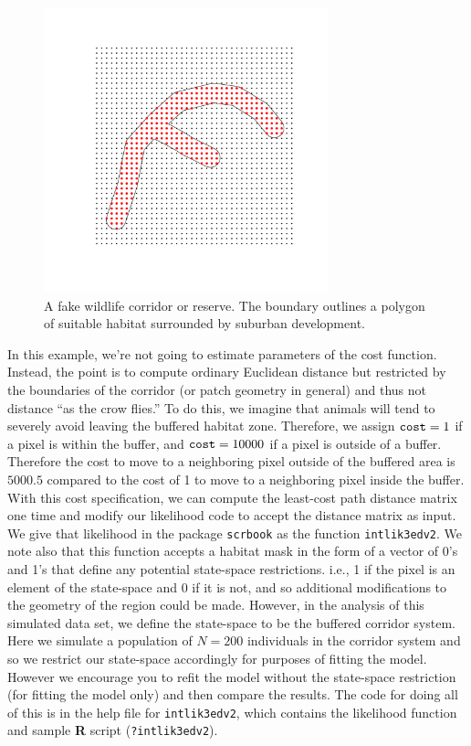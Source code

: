 \begin{figure}[h]
\begin{center}
\includegraphics[height=3.25in,width=3.25in]{Ch12-EcolDist/figs/corridor}
\end{center}
\caption{A fake wildlife corridor or reserve. The boundary outlines
  a polygon of suitable habitat surrounded by suburban development.}
\label{ecoldist.fig.corridor}
\end{figure}

In this example, we're not going to estimate parameters of the cost
function. Instead, the point is to compute ordinary Euclidean distance
but restricted by the boundaries of the corridor (or patch geometry in
general) and thus not distance ``as the crow flies.''  To do this, we
imagine that animals will tend to severely avoid leaving the buffered
habitat zone. Therefore, we assign $\mbox{\tt cost}=1$ if a pixel is
within the buffer, and $\mbox{\tt cost} = 10000$ if a pixel is outside
of a buffer. Therefore the cost to move to a neighboring pixel outside
of the buffered area is $5000.5$ compared to the cost of 1 to move to
a neighboring pixel inside the buffer.  With this cost specification,
we can compute the least-cost path distance matrix one time and modify
our likelihood code to accept the distance matrix as input. We give
that likelihood in the package \mbox{\tt scrbook} as the function
\mbox{\tt intlik3edv2}.  We note also that this function accepts a
habitat mask in the form of a vector of 0's
and 1's
that define any potential state-space restrictions. i.e., 1 if
the pixel is an element of the state-space and 0 if it is not, and so
additional modifications to the geometry of the region could be made.
However, in the analysis of this simulated data set, we define the
state-space to be the buffered corridor system.  Here we simulate a
population of $N=200$ individuals in the corridor system and so we
restrict our state-space accordingly for purposes of fitting the
model. However we encourage you to refit the model without the
state-space restriction (for fitting the model only) and then compare
the results.  The code for doing all of this is in the help file for
\mbox{\tt intlik3edv2}, which contains the likelihood function and
sample {\bf R} script (\mbox{\tt ?intlik3edv2}).

